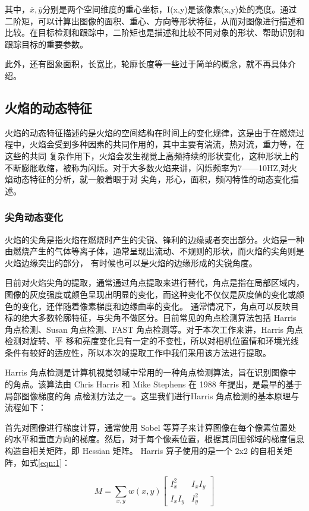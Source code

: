 其中，$\overline{x},\overline{y}$分别是两个空间维度的重心坐标，I(x,y)是该像素(x,y)处的亮度。通过二阶矩，可以计算出图像的面积、重心、方向等形状特征，从而对图像进行描述和比较。在目标检测和跟踪中，二阶矩也是描述和比较不同对象的形状、帮助识别和跟踪目标的重要参数。

此外，还有图象面积，长宽比，轮廓长度等一些过于简单的概念，就不再具体介绍。

\subsection{火焰的动态特征}
火焰的动态特征描述的是火焰的空间结构在时间上的变化规律，这是由于在燃烧过程中，火焰会受到多种因素的共同作用的，其中主要有湍流，热对流，重力等，在这些的共同
复杂作用下，火焰会发生视觉上高频持续的形状变化，这种形状上的不断膨胀收缩，被称为闪烁。对于大多数火焰来讲，闪烁频率为7——10HZ,对火焰动态特征的分析，就一般着眼于对
尖角，形心，面积，频闪特性的动态变化描述。
\subsubsection{尖角动态变化}
火焰的尖角是指火焰在燃烧时产生的尖锐、锋利的边缘或者突出部分。火焰是一种由燃烧产生的气体等离子体，通常呈现出流动、不规则的形状，而火焰的尖角则是火焰边缘突出的部分，
有时候也可以是火焰的边缘形成的尖锐角度。

目前对火焰尖角的提取，通常通过角点提取来进行替代，角点是指在局部区域内，图像的灰度强度或颜色呈现出明显的变化，而这种变化不仅仅是灰度值的变化或颜色的变化，还伴随着像素梯度和边缘曲率的变化。
通常情况下，角点可以反映目标的绝大多数轮廓特征，与尖角不做区分。目前常见的角点检测算法包括 Harris 角点检测、Susan 角点检测、FAST 角点检测等。对于本次工作来讲，Harris 角点检测对旋转、平
移和亮度变化具有一定的不变性，所以对相机位置情和环境光线条件有较好的适应性，所以本次的提取工作中我们采用该方法进行提取。

Harris 角点检测是计算机视觉领域中常用的一种角点检测算法，旨在识别图像中的角点。该算法由 Chris Harris 和 Mike Stephens 在 1988 年提出\cite{harris1988combined}，是最早的基于局部图像梯度的角
点检测方法之一。这里我们进行Harris 角点检测的基本原理与流程如下：

首先对图像进行梯度计算，通常使用 Sobel 等算子来计算图像在每个像素位置处的水平和垂直方向的梯度。然后，对于每个像素位置，根据其周围邻域的梯度信息构造自相关矩阵，即 Hessian 矩阵。
Harris 算子使用的是一个 2x2 的自相关矩阵，如式\ref{eqn:1}：

\begin{equation} \label{eqn:1}
    M = \sum_{x, y} w(x, y)
    \begin{bmatrix}
        I_x ^2&I_xI_y\\I_xI_y&I_y ^2
    \end{bmatrix}
\end{equation}

